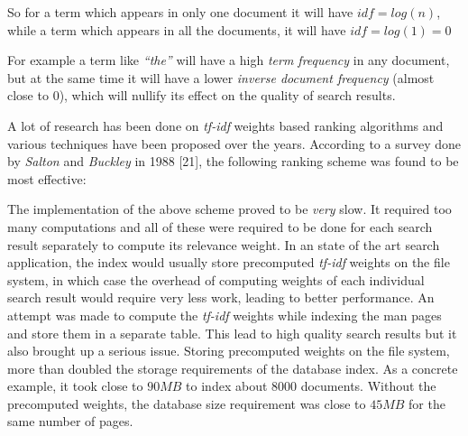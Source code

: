 \documentclass[letterpaper,twocolumn,10pt]{article}
\begin{document}
\begin{description}
So for a term which appears in only one document it will have
$idf = log(n)$,
while a term which appears in all the documents, it will have
$idf = log(1) = 0$

For example a term like \textit{``the''} will have a high
\textit{term frequency} in any
document, but at the same time it will have a lower \textit{inverse document frequency} (almost close to $0$), which will nullify its effect on the quality of search results.

A lot of research has been done on \textit{tf-idf} weights based ranking
algorithms and various techniques have been proposed over the years. According
to a survey done by \textit{Salton} and \textit{Buckley} in 1988 [21], the
following ranking scheme was found to be most effective:

\begin{center}
\end{center}

The implementation of the above scheme proved to be \emph{very} slow. It required
too many computations and all of these were required to be done for each
search result separately to compute its relevance weight. In an state of the
art search application, the index would usually store precomputed \textit{tf-idf}
weights on the file system, in which case the overhead of computing weights of
each individual search result would require very less work, leading to better
performance. An attempt was made to compute the \textit{tf-idf} weights while
indexing the man pages and store them in a separate table. This lead to high
quality search results but it also brought up a serious issue. Storing
precomputed weights on the file system, more than doubled the storage
requirements of the database index. As a concrete example, it took close
to $90 MB$ to index about $8000$ documents. Without the precomputed weights, 
the database size requirement was close to $45 MB$ for the same number of pages.
\end{description}
\end{document}
